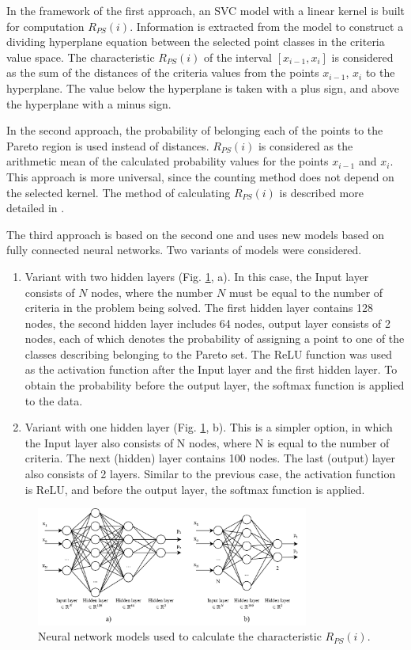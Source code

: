 \documentclass[runningheads]{llncs}
\begin{document}
In the framework of the first approach, an SVC model with a linear kernel is built for computation $R_{PS}(i)$. Information is extracted from the model to construct a dividing hyperplane equation between the selected point classes in the criteria value space. The characteristic $R_{PS}(i)$ of the interval $[x_{i-1},x_i ]$ is considered as the sum of the distances of the criteria values  from the points $x_{i-1}$, $x_i$ to the hyperplane. The value below the hyperplane is taken with a plus sign, and above the hyperplane  with a minus sign.

In the second approach, the probability of belonging  each of the points to the Pareto region is used instead of distances. $R_{PS}(i)$ is considered as the arithmetic mean of the calculated probability values for the points $x_{i-1}$ and $x_i$. This approach is more universal, since the counting method does not depend on the selected kernel. The method of calculating $R_{PS}(i)$ is described more detailed in \cite{Konnov2025}.

The third approach is based on the second one and uses new models based on fully connected neural networks. Two variants of models were considered.
\begin{enumerate}
	\item Variant with two hidden layers (Fig. \ref{fig3}, a). In this case, the Input layer consists of $N$ nodes, where the number $N$ must be equal to the number of criteria in the problem being solved. The first hidden layer contains 128 nodes, the second hidden layer includes 64 nodes, output layer consists of 2 nodes, each of which denotes the probability of assigning a point to one of the classes describing belonging to the Pareto set. The ReLU function was used as the activation function after the Input layer and the first hidden layer. To obtain the probability before the output layer, the softmax function is applied to the data.
	\item Variant with one hidden layer (Fig. \ref{fig3}, b).  This is a simpler option, in which the Input layer also consists of N nodes, where N is equal to the number of criteria. The next (hidden) layer contains 100 nodes. The last (output) layer also consists of 2 layers. Similar to the previous case, the activation function is ReLU, and before the output layer, the softmax function is applied.
\end{enumerate}

\begin{figure}[t]
\center
\includegraphics[width=0.8\textwidth]{fig3.png}
\caption{Neural network models used to calculate the characteristic $R_{PS}(i)$.} \label{fig3}
\end{figure}
\end{document}
